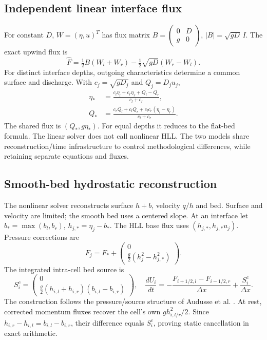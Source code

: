 \documentclass[11pt]{article}
\begin{document}
\subsection{Independent linear interface flux}
For constant $D$, $W=(\eta,u)^T$ has flux matrix
$B=\left(\begin{smallmatrix}0&D\\g&0\end{smallmatrix}\right)$,
$|B|=\sqrt{gD}\,I$. The exact upwind flux is
\begin{equation}
 \widehat F=\tfrac12 B(W_l+W_r)-\tfrac12\sqrt{gD}(W_r-W_l).
\end{equation}
For distinct interface depths, outgoing characteristics determine a common
surface and discharge. With $c_j=\sqrt{gD_j}$ and $Q_j=D_ju_j$,
\begin{align}
 \eta_*&=\frac{c_l\eta_l+c_r\eta_r+Q_l-Q_r}{c_l+c_r},\\
 Q_*&=\frac{c_rQ_l+c_lQ_r+c_lc_r(\eta_l-\eta_r)}{c_l+c_r}.
\end{align}
The shared flux is $(Q_*,g\eta_*)$. For equal depths it reduces to the flat-bed
formula. The linear solver does not call nonlinear HLL. The two models share
reconstruction/time infrastructure to control methodological differences,
while retaining separate equations and fluxes.

\subsection{Smooth-bed hydrostatic reconstruction}
The nonlinear solver reconstructs surface $h+b$, velocity $q/h$ and bed.
Surface and velocity are limited; the smooth bed uses a centered slope.
At an interface let $b_* =\max(b_l,b_r)$,
$h_{j,*}=\eta_j-b_*$. The HLL base flux uses
$(h_{j,*},h_{j,*}u_j)$. Pressure corrections are
\begin{equation}
 F_j=F_*+\begin{pmatrix}0\\\tfrac g2(h_j^2-h_{j,*}^2)\end{pmatrix}.
\end{equation}
The integrated intra-cell bed source is
\begin{equation}
 S_i^c=\begin{pmatrix}0\\
 \tfrac g2(h_{i,l}+h_{i,r})(b_{i,l}-b_{i,r})\end{pmatrix},\quad
 \frac{dU_i}{dt}=-\frac{F_{i+1/2,l}-F_{i-1/2,r}}{\Delta x}
 +\frac{S_i^c}{\Delta x}. \label{eq:wb}
\end{equation}
The construction follows the pressure/source structure of Audusse et al.
\cite{audusse}. At rest, corrected momentum fluxes recover the cell's own
$gh_{i,l/r}^2/2$. Since $h_{i,r}-h_{i,l}=b_{i,l}-b_{i,r}$, their difference
equals $S_i^c$, proving static cancellation in exact arithmetic.
\end{document}
